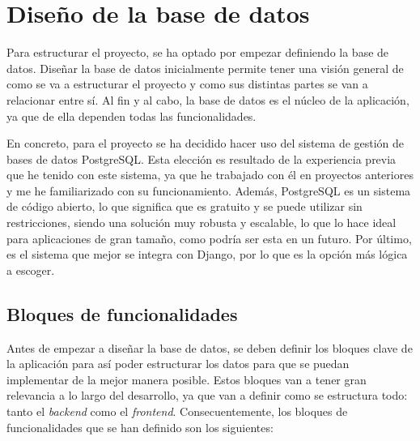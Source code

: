 \section{Diseño de la base de datos}
\label{dev:sec:diseno_base_datos}

Para estructurar el proyecto, se ha optado por empezar definiendo la base de datos. Diseñar la base de datos inicialmente permite tener una visión general de como se va a estructurar el proyecto y como sus distintas partes se van a relacionar entre sí. Al fin y al cabo, la base de datos es el núcleo de la aplicación, ya que de ella dependen todas las funcionalidades.

En concreto, para el proyecto se ha decidido hacer uso del sistema de gestión de bases de datos PostgreSQL. Esta elección es resultado de la experiencia previa que he tenido con este sistema, ya que he trabajado con él en proyectos anteriores y me he familiarizado con su funcionamiento. Además, PostgreSQL es un sistema de código abierto, lo que significa que es gratuito y se puede utilizar sin restricciones, siendo una solución muy robusta y escalable, lo que lo hace ideal para aplicaciones de gran tamaño, como podría ser esta en un futuro. Por último, es el sistema que mejor se integra con Django, por lo que es la opción más lógica a escoger.

\subsection{Bloques de funcionalidades}
\label{dev:subsec:bloques_funcionalidades}

Antes de empezar a diseñar la base de datos, se deben definir los bloques clave de la aplicación para así poder estructurar los datos para que se puedan implementar de la mejor manera posible. Estos bloques van a tener gran relevancia a lo largo del desarrollo, ya que van a definir como se estructura todo: tanto el \textit{backend} como el \textit{frontend}. Consecuentemente, los bloques de funcionalidades que se han definido son los siguientes:

